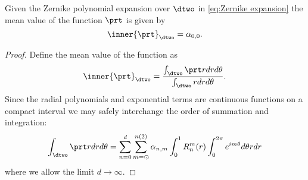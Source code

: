 \begin{myTheorem}
Given the Zernike polynomial expansion over $\dtwo$ in \eqref{eq:Zernike expansion} the mean value of the function $\prt$ is given by
  \begin{equation}
    \inner{\prt}_{\dtwo} = \alpha_{0,0}.
    \label{eq:assertion}
  \end{equation}
\end{myTheorem}
\begin{proof}
Define the mean value of the function as
  \begin{equation}
    \inner{\prt}_{\dtwo} = \frac{\int_{\dtwo}\prt rdrd\theta} {\int_{\dtwo}rdrd\theta}.
  \end{equation}
Since the radial polynomials and exponential terms are continuous functions on a compact interval we may safely interchange the order of summation and integration:
  \begin{equation}
    \int_{\dtwo}\prt rdrd\theta = \sum_{n=0}^{d} \sum_{m=\odot}^{n(2)} \alpha_{n,m} \int_{0}^{1} R_{n}^{m}(r) \int_{0}^{2\pi} e^{i m \theta} d\theta r dr
  \end{equation}
where we allow the limit $d \to \infty$.


\end{proof}
